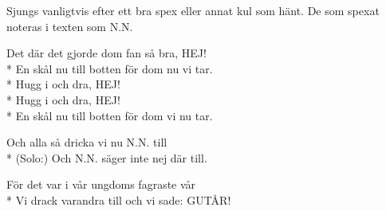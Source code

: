 \begin{SongText}
    \begin{SongInfo}
        Sjungs vanligtvis efter ett bra spex eller annat kul som hänt. De som spexat noteras i texten som N.N.
    \end{SongInfo}
    \begin{SongVerse}
        Det där det gjorde dom fan så bra, HEJ!\\*%
        En skål nu till botten för dom nu vi tar.\\*%
        Hugg i och dra, HEJ!\\*%
        Hugg i och dra, HEJ!\\*%
        En skål nu till botten för dom vi nu tar.
    \end{SongVerse}
    \begin{SongVerse}
        Och alla så dricka vi nu N.N. till\\*%
        (Solo:) Och N.N. säger inte nej där till.
    \end{SongVerse}
    \begin{SongVerse}
        För det var i vår ungdoms fagraste vår\\*%
        Vi drack varandra till och vi sade: GUTÅR!
    \end{SongVerse}
\end{SongText}
